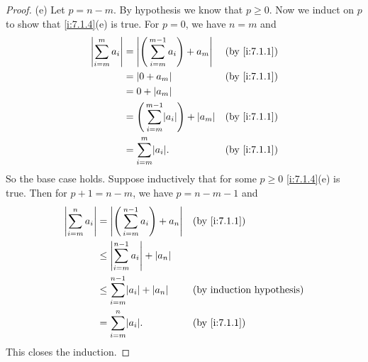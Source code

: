 \begin{proof}{(e)}
  Let \(p = n - m\).
  By hypothesis we know that \(p \geq 0\).
  Now we induct on \(p\) to show that \cref{i:7.1.4}(e) is true.
  For \(p = 0\), we have \(n = m\) and
  \begin{align*}
    \abs{\sum_{i = m}^m a_i} & = \abs{\Bigg(\sum_{i = m}^{m - 1} a_i\Bigg) + a_m}       &  & \by{i:7.1.1} \\
                             & = \abs{0 + a_m}                                          &  & \by{i:7.1.1} \\
                             & = 0 + \abs{a_m}                                                            \\
                             & = \Bigg(\sum_{i = m}^{m - 1} \abs{a_i}\Bigg) + \abs{a_m} &  & \by{i:7.1.1} \\
                             & = \sum_{i = m}^m \abs{a_i}.                              &  & \by{i:7.1.1}
  \end{align*}
  So the base case holds.
  Suppose inductively that for some \(p \geq 0\) \cref{i:7.1.4}(e) is true.
  Then for \(p + 1 = n - m\), we have \(p = n - m - 1\) and
  \begin{align*}
    \abs{\sum_{i = m}^n a_i} & = \abs{\Bigg(\sum_{i = m}^{n - 1} a_i\Bigg) + a_n} &  & \by{i:7.1.1} \\
                             & \leq \abs{\sum_{i = m}^{n - 1} a_i} + \abs{a_n}                      \\
                             & \leq \sum_{i = m}^{n - 1} \abs{a_i} + \abs{a_n}    &  & \byIH        \\
                             & = \sum_{i = m}^n \abs{a_i}.                        &  & \by{i:7.1.1}
  \end{align*}
  This closes the induction.
\end{proof}


